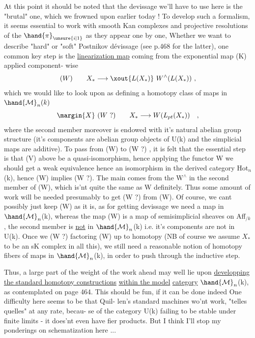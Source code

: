 
At this point it should be noted that the devissage we'll have to use
here is the "brutal" one,  which we frowned upon earlier today !  To
develop such a formalism,  it seems essential to work with smooth Kan
complexes and projective resolutions of the $\hand{\pi}_{\unsure{i|1}}$ as they appear one by one,
  Whether we want to describe "hard" or "soft" Postnikov
dévissage (see p.468 for the latter),  one common key step is the
\uline{linearization map}  coming from the exponential map (K)  applied component-%
wise
\[
(W) \qquad X_{\ast} \longrightarrow \xout{L(X_{\ast})}\ W^{\wedge}(L(X_{\ast})) \ ,
\]
which we would like to look upon as  defining a homotopy class of
maps in $\hand{\mathcal{M}}_n(k)$
\[
\margin{X}\ (W\ ?) \qquad X_{\ast} \longrightarrow W(L_{pt}(X_{\ast})) \quad ,
\]
where the second member moreover is endowed with it's natural abelian
group structure (it's components are abelian group objects of U(k) and the
simplicial maps are additive).  To pass from (W) to (W ?) ,  it is felt
that the essential step is that (V) above be a quasi-isomorphism, hence\hand{,}
applying the functor W\hand{,} we should get a  weak equivalence\hand{,}
hence an isomorphism in the  derived category Hot$_n$(k),  hence
(W)  implies (W ?).  The  main  comes from the W$^{\wedge}$ in the
second member of (W),  which is'nt quite the same as W definitely.  Thus
some amount of work will be needed presumably to get (W ?) from (W).
Of course,  we cant possibly just keep (W) as it is,  as for getting
devissage we need a map in $\hand{\mathcal{M}}_n$(k),  whereas the map (W) is a map of
semisimplicial sheaves on Aff$_{/k}$  ,  the second member is \uline{not} in
$\hand{\mathcal{M}}_n$(k)  i.e. it's components are not in U(k).  Once we  (W ?)
factoring (W) up to homotopy (NB of course we assume $X_{\ast}$ to be an sK
complex in all this),  we still need a reasonable notion of homotopy
fibers of maps in $\hand{\mathcal{M}}_n$(k),  in order to push through the inductive step.

\qquad Thus,  a large part of the weight of the work ahead may well lie
upon \uline{developping the standard homotopy constructions} \uline{within the model}
\uline{category} $\hand{\mathcal{M}}_n$(k),  as contemplated on page 464.  This should be fun,  if
it can be done indeed  One difficulty here seems to be that  Quil-%
len's  standard machines  wo'nt work, "telles quelles" at any rate,  becau-%
se of the category U(k) failing to be stable under finite limits - it
does'nt even have fier products.  But I think I'll stop my ponderings
on schematization here ...

